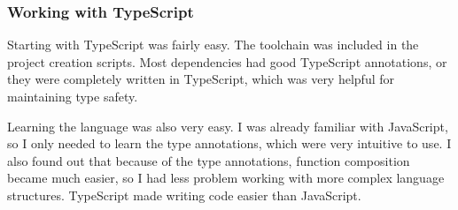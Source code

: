 \subsubsection{Working with TypeScript}\label{sec:working-with-typescript}

Starting with TypeScript was fairly easy.
The toolchain was included in the project creation scripts.
Most dependencies had good TypeScript annotations,
or they were completely written in TypeScript,
which was very helpful for maintaining type safety.

Learning the language was also very easy.
I was already familiar with JavaScript,
so I only needed to learn the type annotations,
which were very intuitive to use.
I also found out that because of the type annotations,
function composition became much easier,
so I had less problem working with more complex
language structures.
TypeScript made writing code easier than JavaScript.
